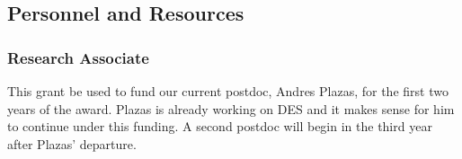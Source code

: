 \documentclass[12pt]{article}
\begin{document}

\subsection{Personnel and Resources} \label{sec:resources}

\subsubsection{Research Associate}

This grant be used to fund our current postdoc, Andres Plazas, for the first
two years of the award. Plazas is already working on DES and it makes sense for
him to continue under this funding.  A second postdoc will begin in the third
year after Plazas' departure.  
\end{document}
